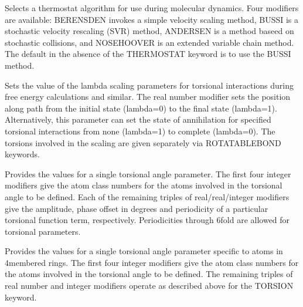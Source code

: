\documentclass[letterpaper,11pt,english]{sphinxmanual}
\begin{document}
\ignorespaces {}\label{\detokenize{text/keywords:key-thermostat}}\begin{description}
\sphinxAtStartPar
Selects a thermostat algorithm for use during molecular dynamics. Four modifiers are available: BERENSDEN invokes a simple velocity scaling method, BUSSI is a stochastic velocity rescaling (SVR) method, ANDERSEN is a method baseed on stochastic collisions, and NOSE\sphinxhyphen{}HOOVER is an extended variable chain method. The default in the absence of the THERMOSTAT keyword is to use the BUSSI method.

\end{description}

\ignorespaces {}\label{\detokenize{text/keywords:key-tors-lambda}}\begin{description}
\sphinxAtStartPar
Sets the value of the lambda scaling parameters for torsional interactions during free energy calculations and similar. The real number modifier sets the position along path from the initial state (lambda=0) to the final state (lambda=1). Alternatively, this parameter can set the state of annihilation for specified torsional interactions from none (lambda=1) to complete (lambda=0). The torsions involved in the scaling are given separately via ROTATABLE\sphinxhyphen{}BOND keywords.

\end{description}

\ignorespaces {}\label{\detokenize{text/keywords:key-torsion}}\begin{description}
\sphinxAtStartPar
Provides the values for a single torsional angle parameter. The first four integer modifiers give the atom class numbers for the atoms involved in the torsional angle to be defined. Each of the remaining triples of real/real/integer modifiers give the amplitude, phase offset in degrees and periodicity of a particular torsional function term, respectively. Periodicities through 6\sphinxhyphen{}fold are allowed for torsional parameters.

\end{description}

\ignorespaces {}\label{\detokenize{text/keywords:key-torsion4}}\begin{description}
\sphinxAtStartPar
Provides the values for a single torsional angle parameter specific to atoms in 4\sphinxhyphen{}membered rings. The first four integer modifiers give the atom class numbers for the atoms involved in the torsional angle to be defined. The remaining triples of real number and integer modifiers operate as described above for the TORSION keyword.

\end{description}
\end{document}
